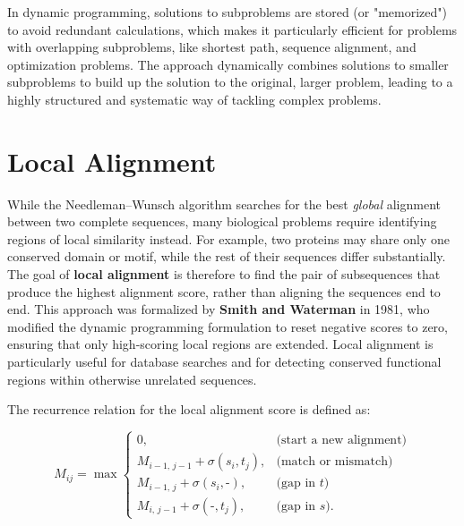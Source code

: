 In dynamic programming, 
solutions to subproblems are stored (or "memorized") to avoid redundant calculations, which makes it particularly efficient for problems with overlapping subproblems, like shortest path, sequence alignment, and optimization problems. The approach dynamically combines solutions to smaller subproblems to build up the solution to the original, larger problem, leading to a highly structured and systematic way of tackling complex problems.

\section{Local Alignment}

While the Needleman--Wunsch algorithm 
searches for the best \emph{global} alignment between two complete sequences, many biological problems require identifying regions of local similarity instead. For example, two proteins may share only one conserved domain or motif, while the rest of their sequences differ substantially. The goal of \textbf{local alignment} is therefore to find the pair of subsequences that produce the highest alignment score, rather than aligning the sequences end to end. This approach was formalized by \textbf{Smith and Waterman} in 1981, who modified the dynamic programming formulation to reset negative scores to zero, ensuring that only high-scoring local regions are extended. Local alignment is particularly useful for database searches and for detecting conserved functional regions within otherwise unrelated sequences.

The recurrence relation for the local alignment score is defined as:

\[
M_{ij} = \max
\begin{cases}
0, & \text{(start a new alignment)}\\[6pt]
M_{i-1,\,j-1} + \sigma(s_i, t_j), & \text{(match or mismatch)}\\[6pt]
M_{i-1,\,j} + \sigma(s_i, \texttt{-}), & \text{(gap in $t$)}\\[6pt]
M_{i,\,j-1} + \sigma(\texttt{-}, t_j), & \text{(gap in $s$)}.
\end{cases}
\]


